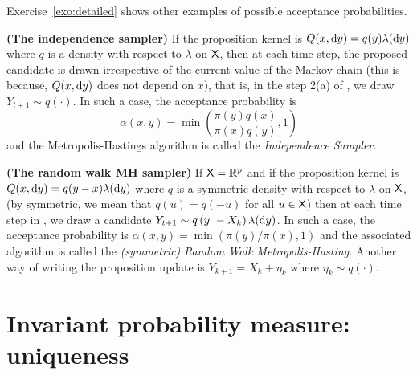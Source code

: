 \documentclass[english,graybox,envcountchap,envcountsame,sectrefs,shortlabels]{svmono}
\theoremstyle{style}
\begin{document}
Exercise~\ref{exo:detailed} shows other examples of possible acceptance probabilities.


\begin{example}
\textbf{(The independence sampler)} If the proposition kernel is $Q(x,\mathrm{d} y)=q(y)\lambda(\mathrm{d} y)$
where $q$ is a density with respect to $\lambda$ on $\mathsf{X}$, then at each time
step, the proposed candidate is drawn irrespective of the current
value of the Markov chain (this is because, $Q(x,\mathrm{d} y)$ does not
depend on $x$), that is, in the step 2(a) of , we draw
$Y_{t+1}\sim q\left(\cdot\right)$. In such  a case, the acceptance probability
is 
$$
\alpha(x,y)=\min\left(\frac{\pi(y)q(x)}{\pi(x)q(y)},1\right)
$$
and the Metropolis-Hastings algorithm is called the \emph{Independence
Sampler. }
\end{example}

\begin{example}
\textbf{(The random walk MH sampler)}  If $\mathsf{X}=\mathbb{R}^{p}$ and if
the proposition kernel is $Q(x,\mathrm{d} y)=q(y-x)\lambda(\mathrm{d} y)$ where
$q$ is a symmetric density with respect to $\lambda$ on $\mathsf{X}$, (by symmetric,
we mean that $q(u)=q(-u)$ for all $u\in\mathsf{X}$) then at each time
step in , we draw a candidate $Y_{t+1}\sim q\left(y\ -X_{k}\right)\lambda(\mathrm{d} y)$.
In such a case, the acceptance probability is $\alpha(x,y)=\min\left(\pi(y)/\pi(x),1\right)$
and the associated algorithm is called the \emph{(symmetric)} \emph{Random
Walk Metropolis-Hasting.}\textbf{ }Another way of writing the proposition
update is $Y_{k+1}=X_{k}+\eta_{k}$ where $\eta_{k}\sim q(\cdot)$.\textbf{ }
\end{example}

\section{Invariant probability measure: uniqueness}
\end{document}
